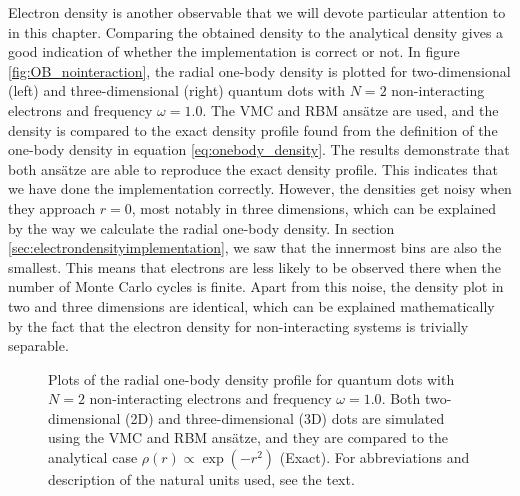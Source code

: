 Electron density is another observable that we will devote particular attention to in this chapter. Comparing the obtained density to the analytical density gives a good indication of whether the implementation is correct or not. In figure \eqref{fig:OB_nointeraction}, the radial one-body density is plotted for two-dimensional (left) and three-dimensional (right) quantum dots with $N=2$ non-interacting electrons and frequency $\omega=1.0$. The VMC and RBM ansätze are used, and the density is compared to the exact density profile found from the definition of the one-body density in equation \ref{eq:onebody_density}. The results demonstrate that both ansätze are able to reproduce the exact density profile. This indicates that we have done the implementation correctly. However, the densities get noisy when they approach $r=0$, most notably in three dimensions, which can be explained by the way we calculate the radial one-body density. In section \ref{sec:electrondensityimplementation}, we saw that the innermost bins are also the smallest. This means that electrons are less likely to be observed there when the number of Monte Carlo cycles is finite. Apart from this noise, the density plot in two and three dimensions are identical, which can be explained mathematically by the fact that the electron density for non-interacting systems is trivially separable.

\begin{figure}
	\centering
	\captionsetup[subfigure]{labelformat=empty}
	\caption{Plots of the radial one-body density profile for quantum dots with $N=2$ non-interacting electrons and frequency $\omega=1.0$. Both two-dimensional (2D) and three-dimensional (3D) dots are simulated using the VMC and RBM ansätze, and they are compared to the analytical case $\rho(r)\propto\exp(-r^2)$ (Exact). For abbreviations and description of the natural units used, see the text.}
	\label{fig:OB_nointeraction}
\end{figure}


